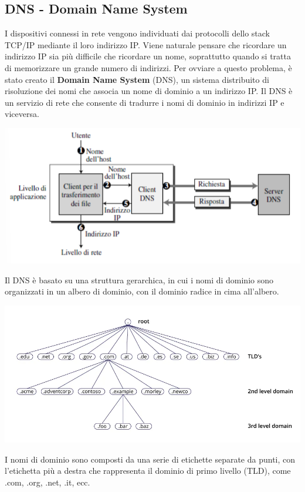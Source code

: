 \documentclass[12pt]{report}
\begin{document}
	\subsection{DNS - Domain Name System}
	I dispositivi connessi in rete vengono individuati dai protocolli dello stack TCP/IP mediante il loro indirizzo IP. Viene naturale pensare che ricordare un indirizzo IP sia più difficile che ricordare un nome, soprattutto quando si tratta di memorizzare un grande numero di indirizzi. Per ovviare a questo problema, è stato creato il \textbf{Domain Name System} (DNS), un sistema distribuito di risoluzione dei nomi che associa un nome di dominio a un indirizzo IP. Il DNS è un servizio di rete che consente di tradurre i nomi di dominio in indirizzi IP e viceversa.
	\begin{center}
		\includegraphics[scale=0.5]{assets/dns.png}
	\end{center}
	Il DNS è basato su una struttura gerarchica, in cui i nomi di dominio sono organizzati in un albero di dominio, con il dominio radice in cima all'albero. 
	\begin{center}
		\includegraphics[scale=0.5]{assets/dns-tree.png}
	\end{center}
	I nomi di dominio sono composti da una serie di etichette separate da punti, con l'etichetta più a destra che rappresenta il dominio di primo livello (TLD), come .com, .org, .net, .it, ecc. 
\end{document}
